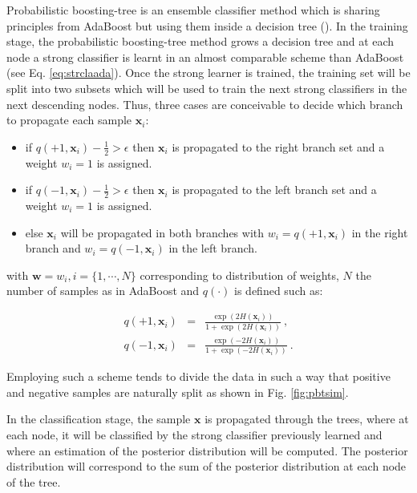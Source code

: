 \begin{enumerate}[leftmargin=*]
Probabilistic boosting-tree is an ensemble classifier method which is sharing principles from AdaBoost but using them inside a decision tree (\cite{Tu2005}). In the training stage, the probabilistic boosting-tree method grows a decision tree and at each node a strong classifier is learnt in an almost comparable scheme than AdaBoost (see Eq. \ref{eq:strclaada}). Once the strong learner is trained, the training set will be split into two subsets which will be used to train the next strong classifiers in the next descending nodes. Thus, three cases are conceivable to decide which branch to propagate each sample $\mathbf{x}_i$:

\begin{itemize}
	\item if $q(+1, \mathbf{x}_i) - \frac{1}{2} > \epsilon$ then $\mathbf{x}_i$ is propagated to the right branch set and a weight $w_i=1$ is assigned. 
	\item if $q(-1, \mathbf{x}_i) - \frac{1}{2} > \epsilon$ then $\mathbf{x}_i$ is propagated to the left branch set and a weight $w_i=1$ is assigned.
	\item else $\mathbf{x}_i$ will be propagated in both branches with $w_i=q(+1, \mathbf{x}_i)$ in the right branch and $w_i=q(-1, \mathbf{x}_i)$ in the left branch.
\end{itemize}

\noindent with $\mathbf{w} = w_i, i=\{1,\cdots,N\}$ corresponding to distribution of weights, $N$ the number of samples as in AdaBoost and $q(\cdot)$ is defined such as:

\begin{eqnarray}
	q(+1, \mathbf{x}_i) & = & \frac{\exp(2H(\mathbf{x}_i))}{1+\exp(2H(\mathbf{x}_i))} \ , \label{eq:regada1} \\
	q(-1, \mathbf{x}_i) & = & \frac{\exp(-2H(\mathbf{x}_i))}{1+\exp(-2H(\mathbf{x}_i))} \ . \label{eq:regada2}
\end{eqnarray}

Employing such a scheme tends to divide the data in such a way that positive and negative samples are naturally split as shown in Fig. \ref{fig:pbtsim}.

In the classification stage, the sample $\mathbf{x}$ is propagated through the trees, where at each node, it will be classified by the strong classifier previously learned and where an estimation of the posterior distribution will be computed. The posterior distribution will correspond to the sum of the posterior distribution at each node of the tree.


\end{enumerate}
